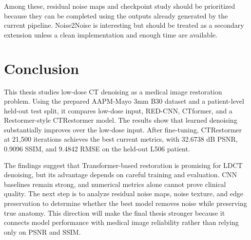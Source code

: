 \documentclass[12pt,a4paper]{report}
\begin{document}
Among these, residual noise maps and checkpoint study should be prioritized because they can be completed using the outputs already generated by the current pipeline. Noise2Noise is interesting but should be treated as a secondary extension unless a clean implementation and enough time are available.

\chapter{Conclusion}

This thesis studies low-dose CT denoising as a medical image restoration problem. Using the prepared AAPM-Mayo 3mm B30 dataset and a patient-level held-out test split, it compares low-dose input, RED-CNN, CTformer, and a Restormer-style CTRestormer model. The results show that learned denoising substantially improves over the low-dose input. After fine-tuning, CTRestormer at 21,500 iterations achieves the best current metrics, with 32.6738 dB PSNR, 0.9096 SSIM, and 9.4842 RMSE on the held-out L506 patient.

The findings suggest that Transformer-based restoration is promising for LDCT denoising, but its advantage depends on careful training and evaluation. CNN baselines remain strong, and numerical metrics alone cannot prove clinical quality. The next step is to analyze residual noise maps, noise texture, and edge preservation to determine whether the best model removes noise while preserving true anatomy. This direction will make the final thesis stronger because it connects model performance with medical image reliability rather than relying only on PSNR and SSIM.
\end{document}
